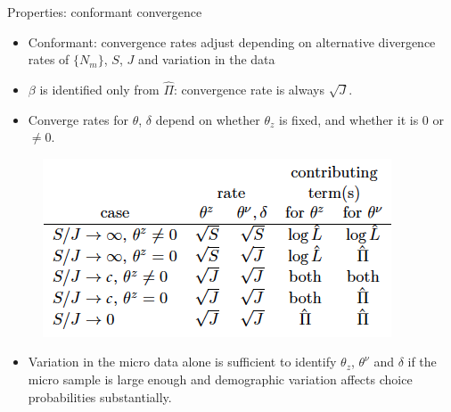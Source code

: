 \documentclass[aspectratio=169,10pt]{beamer}
\begin{document}
\begin{frame}{Properties: conformant convergence}
    
    \begin{itemize}
        \item Conformant: convergence rates adjust depending on alternative divergence rates of $\{N_m\}$, $S$, $J$ and variation in the data
        \item $\beta$ is identified only from $\hat{\Pi}$: convergence rate is always $\sqrt{J}$.
        \item Converge rates for $\theta$, $\delta$ depend on whether $\theta_z$ is fixed, and whether it is 0 or $\neq 0$.
    \end{itemize}
    
    \begin{figure}[htbp]
    \begin{center}
    \includegraphics[width=.4\linewidth]{resources/conformant}
    \label{default}
    \end{center}
    \end{figure}

    \begin{itemize}
        \item Variation in the micro data alone is sufficient to identify $\theta_z$, $\theta^\nu$ and $\delta$ if the micro sample is large enough and demographic variation affects choice probabilities substantially.
    \end{itemize}
\end{frame}





\end{document}
